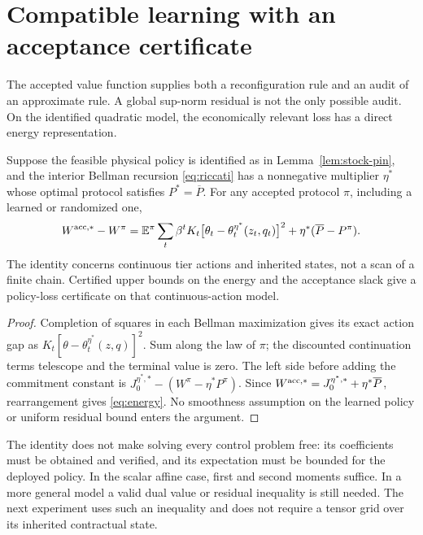 \section{Compatible learning with an acceptance certificate}\label{sec:accepted-learning}
The accepted value function supplies both a reconfiguration rule and an audit of an approximate rule. A global sup-norm residual is not the only possible audit. On the identified quadratic model, the economically relevant loss has a direct energy representation.

\begin{theorem}\label{thm:energy}
Suppose the feasible physical policy is identified as in Lemma~\ref{lem:stock-pin}, and the interior Bellman recursion \eqref{eq:riccati} has a nonnegative multiplier $\eta^*$ whose optimal protocol satisfies $P^*=\overline P$. For any accepted protocol $\pi$, including a learned or randomized one,
\begin{equation}\label{eq:energy}
 W^{\rm acc,*}-W^\pi
 =\mathbb E^\pi\sum_t\beta^t K_t
    \bigl[\theta_t-\theta_t^{\eta^*}(z_t,q_t)\bigr]^2
   +\eta^*(\overline P-P^\pi).
\end{equation}
The identity concerns continuous tier actions and inherited states, not a scan of a finite chain. Certified upper bounds on the energy and the acceptance slack give a policy-loss certificate on that continuous-action model.
\end{theorem}
\begin{proof}
Completion of squares in each Bellman maximization gives its exact action gap as $K_t[\theta-\theta_t^{\eta^*}(z,q)]^2$. Sum along the law of $\pi$; the discounted continuation terms telescope and the terminal value is zero. The left side before adding the commitment constant is $J^{\eta^*,*}_0-(W^\pi-\eta^*P^\pi)$. Since $W^{\rm acc,*}=J^{\eta^*,*}_0+\eta^*\overline P$, rearrangement gives \eqref{eq:energy}. No smoothness assumption on the learned policy or uniform residual bound enters the argument.
\end{proof}
The identity does not make solving every control problem free: its coefficients must be obtained and verified, and its expectation must be bounded for the deployed policy. In the scalar affine case, first and second moments suffice. In a more general model a valid dual value or residual inequality is still needed. The next experiment uses such an inequality and does not require a tensor grid over its inherited contractual state.

